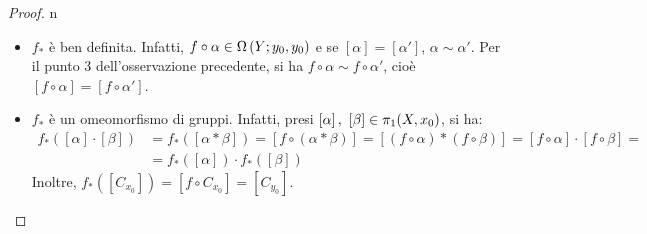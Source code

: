 \begin{proof}{n}~{}
	\begin{itemize}
		\item $f_{\ast}$ è ben definita. Infatti, $f\circ\alpha\in\Omega\left(Y; y_0,y_0\right)$ e se $\left[\alpha\right]=\left[\alpha'\right]$, $\alpha\sim\alpha'$. Per il punto 3 dell'osservazione precedente, si ha $f\circ \alpha\sim f\circ\alpha'$, cioè $\left[f\circ \alpha\right]=\left[f\circ\alpha'\right]$.
		\item $f_{\ast}$ è un omeomorfismo di gruppi. Infatti, presi $\left[\alpha\right],\ \left[\beta\right]\in\homotopy[1]{X,x_0}$, si ha:
		\begin{align*}
			f_{\ast}\left(\left[\alpha\right]\cdot\left[\beta\right]\right)&=f_{\ast}\left(\left[\alpha\ast\beta\right]\right)=\left[f\circ\left(\alpha\ast\beta\right)\right]=\left[\left(f\circ\alpha\right)\ast\left(f\circ\beta\right)\right]=\left[f\circ\alpha\right]\cdot\left[f\circ\beta\right]=\\&=f_{\ast}\left(\left[\alpha\right]\right)\cdot f_{\ast}\left(\left[\beta\right]\right)
		\end{align*}
	Inoltre, $f_{\ast}\left(\left[C_{x_0}\right]\right)=\left[f\circ C_{x_0}\right]=\left[C_{y_0}\right]$.\qedhere
	\end{itemize}
\end{proof}
